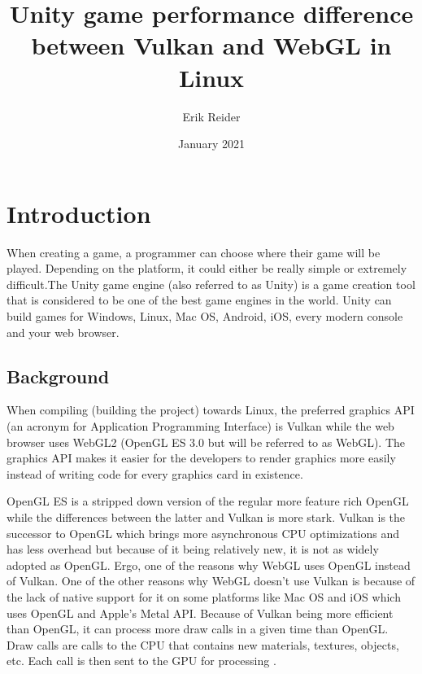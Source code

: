 \documentclass{article}
\title{Unity game performance difference between Vulkan and WebGL in Linux}
\author{Erik Reider}
\date{January 2021}
\begin{document}
\maketitle
\newpage

\begin{abstract}

\end{abstract}


\newpage
\tableofcontents
\newpage


\section {Introduction}
When creating a game, a programmer can choose where their game will be played. Depending on the platform, it could either be really simple or extremely difficult.The Unity game engine (also referred to as Unity) is a game creation tool that is considered to be one of the best game engines in the world. Unity can build games for Windows, Linux, Mac OS, Android, iOS, every modern console and your web browser.

\subsection {Background}
When compiling (building the project) towards Linux, the preferred graphics API (an acronym for Application Programming Interface) is Vulkan while the web browser uses WebGL2 (OpenGL ES 3.0 but will be referred to as WebGL). The graphics API makes it easier for the developers to render graphics more easily instead of writing code for every graphics card in existence\cite{APIWiki}. \par

OpenGL ES is a stripped down version of the regular more feature rich OpenGL while the differences between the latter and Vulkan is more stark. Vulkan is the successor to OpenGL which brings more asynchronous CPU optimizations and has less overhead but because of it being relatively new, it is not as widely adopted as OpenGL. Ergo, one of the reasons why WebGL uses OpenGL instead of Vulkan. One of the other reasons why WebGL doesn’t use Vulkan is because of the lack of native support for it on some platforms like Mac OS and iOS which uses OpenGL and Apple’s Metal API. Because of Vulkan being more efficient than OpenGL, it can process more draw calls in a given time than OpenGL. Draw calls are calls to the CPU that contains new materials, textures, objects, etc. Each call is then sent to the GPU for processing \cite{DrawCalls}. \par
\end{document}
